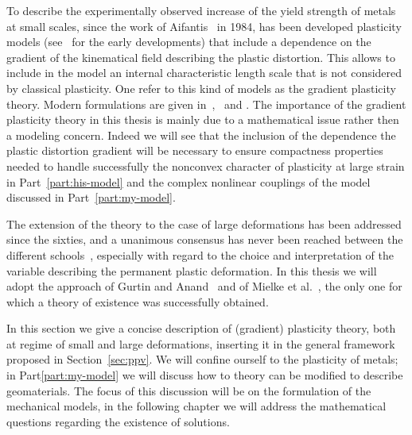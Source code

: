 \documentclass[a4paper,10pt,oneside]{amsbook}
\numberwithin{section}{chapter}
\numberwithin{equation}{chapter}
\theoremstyle{definition}
\begin{document}
To describe the experimentally observed increase of the yield strength of metals at small scales, since the work of Aifantis~\cite{Aifantis1984} in 1984, has been developed plasticity models (see~\cite{FleckHutchinson1993} for the early developments) that include a dependence on the gradient of the kinematical field describing the plastic distortion. This allows to include in the model an internal characteristic length scale that is not considered by classical plasticity. One refer to this kind of models as the gradient plasticity theory. Modern formulations are given in~\cite{gurtin-anand-small},~\cite{gurtin-anand-large} and \cite{BertramForest2020}. The importance of the gradient plasticity theory in this thesis is mainly due to a mathematical issue rather then a modeling concern. Indeed we will see that the inclusion of the dependence the plastic distortion gradient will be necessary to ensure compactness properties needed to handle successfully the nonconvex character of plasticity at large strain in Part~\ref{part:his-model} and the complex nonlinear couplings of the model discussed in Part~\ref{part:my-model}.


The extension of the theory to the case of large deformations has been addressed since the sixties, and a unanimous consensus has never been reached between the different schools~\cite{Naghdi1990,DavoliFrancfort2021}, especially with regard to the choice and interpretation of the variable describing the permanent plastic deformation. In this thesis we will adopt the approach of Gurtin and Anand~\cite{gurtin-anand-fried,gurtin-anand-large} and of Mielke et al.~\cite{mielke}, the only one for which a theory of existence was successfully obtained.

In this section we give a concise description of (gradient) plasticity theory, both at regime of small and large deformations, inserting it in the general framework proposed in Section~\ref{sec:ppv}. We will confine ourself to the plasticity of metals; in Part\ref{part:my-model} we will discuss how to theory can be modified to describe geomaterials. The focus of this discussion will be on the formulation of the mechanical models, in the following chapter we will address the mathematical questions regarding the existence of solutions.
\end{document}
